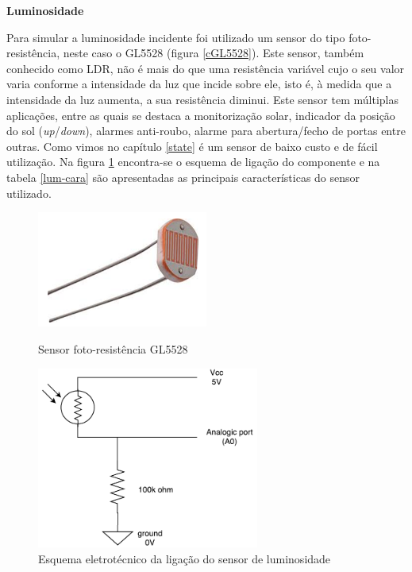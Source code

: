 \textbf{Luminosidade}



Para simular a luminosidade incidente foi utilizado um sensor do tipo foto-resistência, neste caso o GL5528 (figura \ref{cGL5528}). Este sensor, também conhecido como \ac{LDR}, não é mais do que uma resistência variável cujo o seu valor varia conforme a intensidade da luz que incide sobre ele, isto é, à medida que a intensidade da luz aumenta, a sua resistência diminui. Este sensor tem múltiplas aplicações, entre as quais se destaca a monitorização solar, indicador da posição do sol (\textit{up}/\textit{down}), alarmes anti-roubo, alarme para abertura/fecho de portas entre outras. Como vimos no capítulo \ref{state} é um sensor de baixo custo e de fácil utilização. Na figura \ref{lum-esquema} encontra-se o esquema de ligação do componente e na tabela \ref{lum-cara} são apresentadas as principais características do sensor utilizado. 







\begin{figure}[h]
	\centering
	\begin{minipage}[b]{0.49\textwidth}
		\centering
		\includegraphics[width=0.5\textwidth]{img/hardware/luminosidade.png}
		\caption{Sensor foto-resistência GL5528}
		\label{cGL5528}
	\end{minipage}
	\hfill
	\begin{minipage}[b]{0.49\textwidth}
		\centering
		\includegraphics[width=0.65\textwidth]{img/hardware/lumi_esquema.pdf}
		\caption{Esquema eletrotécnico da ligação do sensor de luminosidade}
		\label{lum-esquema}
	\end{minipage}
\end{figure}







